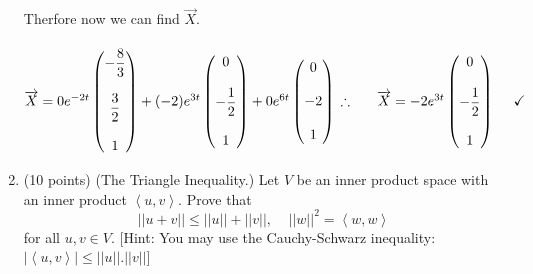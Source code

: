 \documentclass[fleqn]{article}
\begin{document}
\begin{enumerate}
{        Therfore now we can find $\overrightarrow{X}$.
        \\
        \\
        $
          \overrightarrow{X}=0 e^{-2 t} \begin{pmatrix}
            -\dfrac{8}{3}
            \\
            \\
            \dfrac{3}{2}
            \\
            \\
            1
          \end{pmatrix}+(-2) e^{3 t} \begin{pmatrix}
            0
            \\
            \\
            -\dfrac{1}{2}
            \\
            \\
            1
          \end{pmatrix}+0 e^{6 t} \begin{pmatrix}
            0
            \\
            \\
            -2
            \\
            \\
            1
          \end{pmatrix}
          \\
          \\
          \\
          \\
          \therefore ~~~~~ \overrightarrow{X}=-2e^{3 t} \begin{pmatrix}
            0
            \\
            \\
            -\dfrac{1}{2}
            \\
            \\
            1
          \end{pmatrix} ~~~~ \checkmark
        $
      }


    \item (10 points) (The Triangle Inequality.) Let $V$ be an inner product space with an inner product
    $\left\langle u, v\right\rangle$. Prove that 
    $$
      ||u+v|| \leq ||u||+||v||, ~~~~~ ||w||^2=\left\langle w, w\right\rangle
    $$
    for all $u,v \in V$.  [Hint: You may use the Cauchy-Schwarz inequality: $|\left\langle u, v\right\rangle | \leq ||u||.||v||$]


\end{enumerate}
\end{document}
